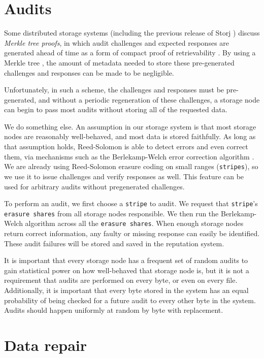 \documentclass[11pt,fleqn,openany]{book}
\newcommand{\x}[1]{{\tt #1}} \newcommand{\code}[1]{{\tt #1}}
\begin{document}
\section{Audits}

Some distributed storage systems (including the previous release of Storj
\cite{storj-v2}) discuss {\em Merkle tree proofs}, in which audit challenges
and expected responses are generated ahead of time as a form of compact
proof of retrievability \cite{proof-of-retrievability}. By using a Merkle tree
\cite{merkle-tree}, the amount of metadata needed to store these pre-generated
challenges and responses can be made to be negligible.

Unfortunately, in such a scheme, the challenges and responses must be
pre-generated, and without a periodic regeneration of these challenges, a
storage node can begin to pass most audits without storing all of the requested
data.

We do something else.
An assumption in our storage system is that most storage nodes are
reasonably well-behaved, and most data is stored faithfully. As long as that
assumption holds, Reed-Solomon is able to detect errors and even correct them,
via mechanisms such as the Berlekamp-Welch error correction algorithm \cite{bw}.
We are already using Reed-Solomon erasure coding
\cite{rs} on small ranges (\x{stripes}), so we use it to issue challenges and
verify responses as well.
This feature can be used for arbitrary audits without pregenerated challenges.

To perform an audit, we first choose a \x{stripe} to audit. We request that
\x{stripe}'s \x{erasure shares} from all storage nodes responsible. We then run
the Berlekamp-Welch algorithm \cite{bw} across all the \x{erasure shares}. When
enough storage nodes return correct information, any faulty or missing response
can easily be identified. These audit failures will be stored and saved in the
reputation system.

It is important that every storage node has a frequent set of random audits to
gain statistical power on how well-behaved that storage node is, but it is not
a requirement that audits are performed on every byte, or even on every file.
Additionally, it is important that every byte stored in the system has an equal
probability of being checked for a future audit to every other byte in the
system. Audits should happen uniformly at random by byte with replacement.

\section{Data repair}\label{sec:data_repair}
\end{document}
